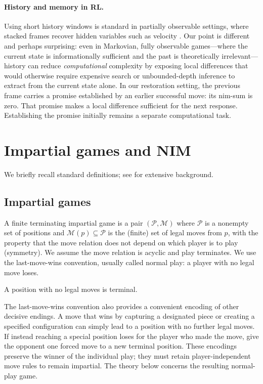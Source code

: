 \documentclass[twoside,11pt]{article}
\numberwithin{theorem}{section}
\numberwithin{equation}{section}
\begin{document}
\paragraph{History and memory in RL.}
Using short history windows is standard in partially observable settings, where stacked frames recover hidden variables such as velocity \citep{mnih2015humanlevel}.
Our point is different and perhaps surprising: even in Markovian, fully observable games---where the current state is informationally sufficient and the past is theoretically irrelevant---history can reduce \emph{computational} complexity by exposing local differences that would otherwise require expensive search or unbounded-depth inference to extract from the current state alone.
In our restoration setting, the previous frame carries a promise established by an earlier successful move: its nim-sum is zero. That promise makes a local difference sufficient for the next response. Establishing the promise initially remains a separate computational task.


\section{Impartial games and NIM}
\label{sec:impartial}

We briefly recall standard definitions; see \citep{berlekamp2001winningways} for extensive background.

\subsection{Impartial games}
\begin{definition}
\label{def:impartial}
A finite terminating impartial game is a pair $(\mathcal{P},\mathcal{M})$ where $\mathcal{P}$ is a nonempty set of positions and $\mathcal{M}(p)\subseteq \mathcal{P}$ is the (finite) set of legal moves from $p$, with the property that the move relation does not depend on which player is to play (symmetry). We assume the move relation is acyclic and play terminates. We use the last-move-wins convention, usually called normal play: a player with no legal move loses.
\end{definition}

A position with no legal moves is terminal.

The last-move-wins convention also provides a convenient encoding of other decisive endings. A move that wins by capturing a designated piece or creating a specified configuration can simply lead to a position with no further legal moves. If instead reaching a special position loses for the player who made the move, give the opponent one forced move to a new terminal position. These encodings preserve the winner of the individual play; they must retain player-independent move rules to remain impartial. The theory below concerns the resulting normal-play game.
\end{document}
